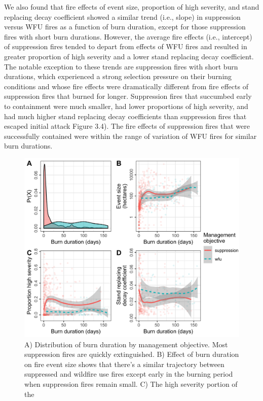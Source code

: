 \documentclass[twoside,12pt,final]{ucthesis-CA2012}
\begin{document}
\begin{ucmainmatter}
We also found that fire effects of event size, proportion of high
severity, and stand replacing decay coefficient showed a similar trend
(i.e., slope) in suppression versus WFU fires as a function of burn
duration, except for those suppression fires with short burn durations.
However, the average fire effects (i.e., intercept) of suppression fires
tended to depart from effects of WFU fires and resulted in greater
proportion of high severity and a lower stand replacing decay
coefficient. The notable exception to these trends are suppression fires
with short burn durations, which experienced a strong selection pressure
on their burning conditions and whose fire effects were dramatically
different from fire effects of suppression fires that burned for longer.
Suppression fires that succumbed early to containment were much smaller,
had lower proportions of high severity, and had much higher stand
replacing decay coefficients than suppression fires that escaped initial
attack Figure 3.4). The fire effects of suppression fires that were
successfully contained were within the range of variation of WFU fires
for similar burn durations.
\begin{figure}
\centering
\includegraphics[width=6.00000in]{figure/chap03/burn-duration-4-panel.png}
\caption{A) Distribution of burn duration by management objective. Most
suppression fires are quickly extinguished. B) Effect of burn duration
on fire event size shows that there's a similar trajectory between
suppressed and wildfire use fires except early in the burning period
when suppression fires remain small. C) The high severity portion of the
}
\end{figure}
\end{ucmainmatter}
\end{document}
